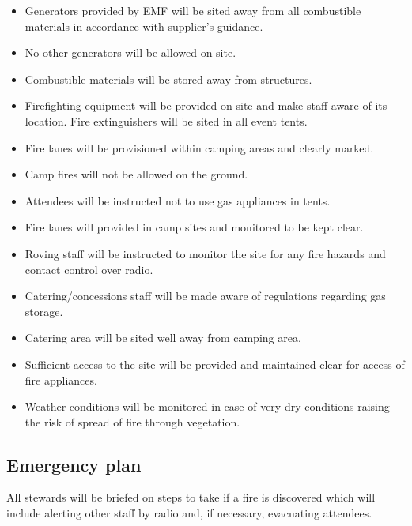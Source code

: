 \begin{itemize}
\item Generators provided by EMF will be sited away from all combustible materials in accordance with supplier's guidance.
\item No other generators will be allowed on site.
\item Combustible materials will be stored away from structures.
\item Firefighting equipment will be provided on site and make staff aware of its location. Fire extinguishers will be sited in all event tents.
\item Fire lanes will be provisioned within camping areas and clearly marked.
\item Camp fires will not be allowed on the ground.
\item Attendees will be instructed not to use gas appliances in tents.
\item Fire lanes will provided in camp sites and monitored to be kept clear.
\item Roving staff will be instructed to monitor the site for any fire hazards and contact control over radio.
\item Catering/concessions staff will be made aware of regulations regarding gas storage.
\item Catering area will be sited well away from camping area.
\item Sufficient access to the site will be provided and maintained clear for access of fire appliances.
\item Weather conditions will be monitored in case of very dry conditions raising the risk of spread of fire through vegetation.
\end{itemize}

\subsection{Emergency plan}

All stewards will be briefed on steps to take if a fire is discovered which will include alerting other staff by radio and, if necessary, evacuating attendees.

